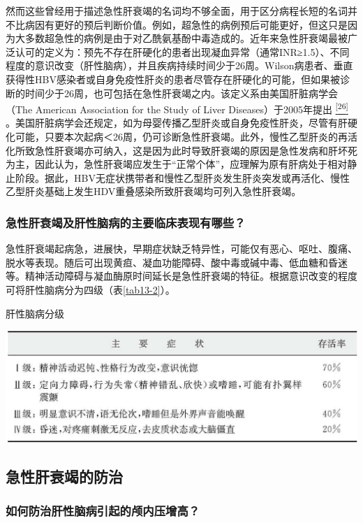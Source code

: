 然而这些曾经用于描述急性肝衰竭的名词均不够全面，用于区分病程长短的名词并不比病因有更好的预后判断价值。例如，超急性的病例预后可能更好，但这只是因为大多数超急性的病例是由于对乙酰氨基酚中毒造成的。近年来急性肝衰竭最被广泛认可的定义为：预先不存在肝硬化的患者出现凝血异常（通常INR≥1.5）、不同程度的意识改变（肝性脑病），并且疾病持续时间少于26周。Wilson病患者、垂直获得性HBV感染者或自身免疫性肝炎的患者尽管存在肝硬化的可能，但如果被诊断的时间少于26周，也可包括在急性肝衰竭之内。该定义系由美国肝脏病学会（The
American Association for the Study of Liver Diseases）于2005年提出
\protect\hyperlink{text00019.htmlux5cux23ch26-18}{\textsuperscript{{[}26{]}}}
。美国肝脏病学会还规定，如为母婴传播乙型肝炎或自身免疫性肝炎，尽管有肝硬化可能，只要本次起病＜26周，仍可诊断急性肝衰竭。此外，慢性乙型肝炎的再活化所致急性肝衰竭亦可纳入，这是因为此时导致肝衰竭的原因是急性发病和肝坏死为主，因此认为，急性肝衰竭应发生于“正常个体”，应理解为原有肝病处于相对静止阶段。据此，HBV无症状携带者和慢性乙型肝炎发生肝炎突发或再活化、慢性乙型肝炎基础上发生HDV重叠感染所致肝衰竭均可列入急性肝衰竭。

\subsubsection{急性肝衰竭及肝性脑病的主要临床表现有哪些？}

急性肝衰竭起病急，进展快，早期症状缺乏特异性，可能仅有恶心、呕吐、腹痛、脱水等表现。随后可出现黄疸、凝血功能障碍、酸中毒或碱中毒、低血糖和昏迷等。精神活动障碍与凝血酶原时间延长是急性肝衰竭的特征。根据意识改变的程度可将肝性脑病分为四级（表\ref{tab13-2}）。

\begin{table}[htbp]
\centering
\caption{肝性脑病分级}
\label{tab13-2}
\includegraphics{./images/Image00104.jpg}
\end{table}

\subsection{急性肝衰竭的防治}

\subsubsection{如何防治肝性脑病引起的颅内压增高？}

